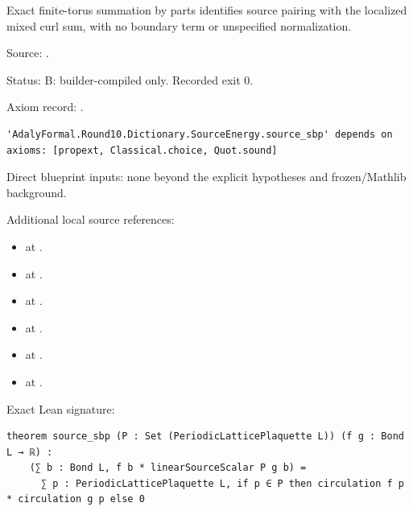\begin{theorem}[bp-142]
\label{bp-142}
\uses{}
\leanok
Exact finite-torus summation by parts identifies source pairing with the localized mixed curl sum, with no boundary term or unspecified normalization.

\par Source: \texttt{}.
\par Status: B: builder-compiled only. Recorded exit 0.
\par Axiom record: \texttt{}.
\begin{verbatim}
'AdalyFormal.Round10.Dictionary.SourceEnergy.source_sbp' depends on axioms: [propext, Classical.choice, Quot.sound]
\end{verbatim}
\par Direct blueprint inputs: none beyond the explicit hypotheses and frozen/Mathlib background.
\par Additional local source references:
\begin{itemize}
\item \texttt{} at \texttt{}.
\item \texttt{} at \texttt{}.
\item \texttt{} at \texttt{}.
\item \texttt{} at \texttt{}.
\item \texttt{} at \texttt{}.
\item \texttt{} at \texttt{}.
\end{itemize}
\par Exact Lean signature:
\begin{verbatim}
theorem source_sbp (P : Set (PeriodicLatticePlaquette L)) (f g : Bond L → ℝ) :
    (∑ b : Bond L, f b * linearSourceScalar P g b) =
      ∑ p : PeriodicLatticePlaquette L, if p ∈ P then circulation f p * circulation g p else 0
\end{verbatim}
\end{theorem}


